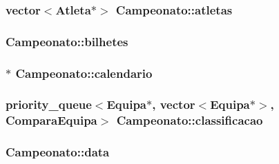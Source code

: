 \subsubsection[{atletas}]{\setlength{\rightskip}{0pt plus 5cm}vector$<${\bf Atleta}$\ast$$>$ Campeonato\+::atletas\hspace{0.3cm}{\ttfamily [private]}}\label{class_campeonato_a06b7fd65d33044bff509122140774509}
\hypertarget{class_campeonato_a249c44f11d932f372f9f78959e1ff5b6}{}
\subsubsection[{bilhetes}]{ Campeonato\+::bilhetes\hspace{0.3cm}{\ttfamily [private]}}\label{class_campeonato_a249c44f11d932f372f9f78959e1ff5b6}
\hypertarget{class_campeonato_af4bf75bd6daa812d16ab2be60c356f21}{}
\subsubsection[{calendario}]{$\ast$ Campeonato\+::calendario\hspace{0.3cm}{\ttfamily [private]}}\label{class_campeonato_af4bf75bd6daa812d16ab2be60c356f21}
\hypertarget{class_campeonato_a18205708f31afeb6c1b172aecfb10cac}{}
\subsubsection[{classificacao}]{\setlength{\rightskip}{0pt plus 5cm}priority\+\_\+queue$<${\bf Equipa}$\ast$, vector$<${\bf Equipa}$\ast$$>$, {\bf Compara\+Equipa}$>$ Campeonato\+::classificacao\hspace{0.3cm}{\ttfamily [private]}}\label{class_campeonato_a18205708f31afeb6c1b172aecfb10cac}
\hypertarget{class_campeonato_ab9a3d4a07de27528556e0ffebda3ba97}{}
\subsubsection[{data}]{ Campeonato\+::data\hspace{0.3cm}{\ttfamily [private]}}\label{class_campeonato_ab9a3d4a07de27528556e0ffebda3ba97}
\hypertarget{class_campeonato_ab65bbad67e796b73176b696457ea39ea}{}
